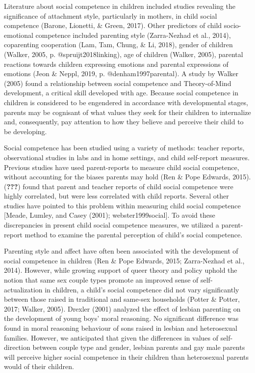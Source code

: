 \documentclass[man]{apa6}
\begin{document}
Literature about social competence in children included studies revealing the significance of attachment style, particularly in mothers, in child social competence (Barone, Lionetti, \& Green, 2017). Other predictors of child socio-emotional competence included parenting style (Zarra-Nezhad et al., 2014), coparenting cooperation (Lam, Tam, Chung, \& Li, 2018), gender of children (Walker, 2005, p. @spruijt2018linking), age of children (Walker, 2005), parental reactions towards children expressing emotions and parental expressions of emotions (Jeon \& Neppl, 2019, p. @denham1997parental). A study by Walker (2005) found a relationship between social competence and Theory-of-Mind development, a critical skill developed with age. Because social competence in children is considered to be engendered in accordance with developmental stages, parents may be cognisant of what values they seek for their children to internalize and, consequently, pay attention to how they believe and perceive their child to be developing.

Social competence has been studied using a variety of methods: teacher reports, observational studies in labs and in home settings, and child self-report measures. Previous studies have used parent-reports to measure child social competence, without accounting for the biases parents may hold (Ren \& Pope Edwards, 2015). ({\textbf{???}}) found that parent and teacher reports of child social competence were highly correlated, but were less correlated with child reports. Several other studies have pointed to this problem within measuring child social competence {[}Meade, Lumley, and Casey (2001); webster1999social{]}. To avoid these discrepancies in present child social competence measures, we utilized a parent-report method to examine the parental perception of child's social competence.

Parenting style and affect have often been associated with the development of social competence in children (Ren \& Pope Edwards, 2015; Zarra-Nezhad et al., 2014). However, while growing support of queer theory and policy uphold the notion that same sex couple types promote an improved sense of self-actualization in children, a child's social competence did not vary significantly between those raised in traditional and same-sex households (Potter \& Potter, 2017; Walker, 2005). Drexler (2001) analyzed the effect of lesbian parenting on the development of young boys' moral reasoning. No significant difference was found in moral reasoning behaviour of sons raised in lesbian and heterosexual families. However, we anticipated that given the differences in values of self-direction between couple type and gender, lesbian parents and gay male parents will perceive higher social competence in their children than heterosexual parents would of their children.
\end{document}

